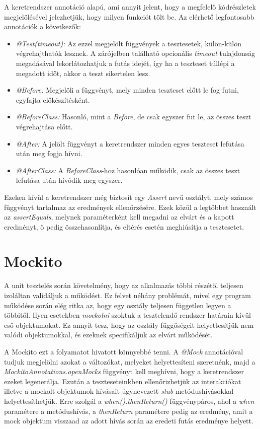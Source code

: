 A keretrendszer annotáció alapú, ami annyit jelent, hogy a megfelelő kódrészletek megjelölésével jelezhetjük, hogy milyen funkciót tölt be. Az elérhető legfontosabb annotációk a következők:
\begin{itemize}
	\item \emph{@Test(timeout):} Az ezzel megjelölt függvények a tesztesetek, külön-külön végrehajthatók lesznek. A zárójelben található opcionális \emph{timeout} tulajdonság megadásával lekorlátozhatjuk a futás idejét, így ha a teszteset túllépi a megadott időt, akkor a teszt sikertelen lesz.
	\item \emph{@Before:} Megjelöli a függvényt, mely minden teszteset előtt le fog futni, egyfajta előkészítésként.
	\item \emph{@BeforeClass:} Hasonló, mint a \emph{Before}, de csak egyszer fut le, az összes teszt végrehajtása előtt.
	\item \emph{@After:} A jelölt függvényt a keretrendszer minden egyes teszteset lefutása után meg fogja hívni.
	\item \emph{@AfterClass:} A \emph{BeforeClass}-hoz hasonlóan működik, csak az összes teszt lefutása után hívódik meg egyszer.
\end{itemize}

Ezeken kívül a keretrendszer még biztosít egy \emph{Assert} nevű osztályt, mely számos függvényt tartalmaz az eredmények ellenőrzésére. Ezek közül a legtöbbet használt az \emph{assertEquals}, melynek paraméterként kell megadni az elvárt és a kapott eredményt, ő pedig összehasonlítja, és eltérés esetén meghiúsítja a tesztesetet. \cite{JUnit}

\section{Mockito}

A unit tesztelés során követelmény, hogy az alkalmazás többi részétől teljesen izoláltan validáljuk a működést. Ez felvet néhány problémát, mivel egy program működése során elég ritka az, hogy egy osztály teljesen független legyen a többitől. Ilyen esetekben \emph{mockolni} szoktuk a tesztelendő rendszer határain kívül eső objektumokat. Ez annyit tesz, hogy az osztály függőségeit helyettesítjük nem valódi objektumokkal, és ezeknek specifikáljuk az elvárt működését.

A Mockito ezt a folyamatot hivatott könnyebbé tenni. A \emph{@Mock} annotációval tudjuk megjelölni azokat a változókat, melyeket helyettesíteni szeretnénk, majd a \emph{MockitoAnnotations.openMocks} függvényt kell meghívni, hogy a keretrendszer ezeket legenerálja. Ezután a teszteseteinkben ellenőrizhetjük az interakciókat illetve a mockolt objektumok hívásait úgynevezett \emph{stub} metódushívásokkal helyettesíthetjük. Erre szolgál a \emph{when().thenReturn()} függvénypáros, ahol a \emph{when} paramétere a metódushívás, a \emph{thenReturn} paramétere pedig az eredmény, amit a mock objektum visszaad az adott hívás során az eredeti futás eredménye helyett.

